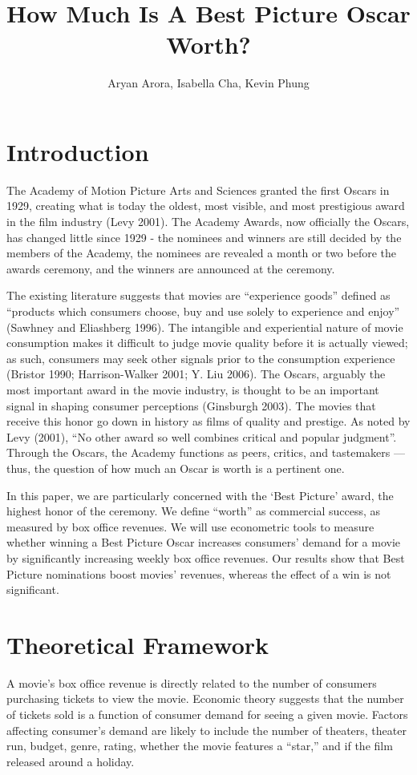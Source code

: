 \documentclass[10.7pt]{article} %
\date{}
\begin{document}
\title{How Much Is A Best Picture Oscar Worth?}
\author{Aryan Arora, Isabella Cha, Kevin Phung}
\maketitle

\section{Introduction}
The Academy of Motion Picture Arts and Sciences granted the first Oscars in 1929, creating what is today the oldest, most visible, and most prestigious award in the film industry (Levy 2001). The Academy Awards, now officially the Oscars, has changed little since 1929 - the nominees and winners are still decided by the members of the Academy, the nominees are revealed a month or two before the awards ceremony, and the winners are announced at the ceremony.

The existing literature suggests that movies are “experience goods” defined as “products which consumers choose, buy and use solely to experience and enjoy” (Sawhney and Eliashberg 1996). The intangible and experiential nature of movie consumption makes it difficult to judge movie quality before it is actually viewed; as such, consumers may seek other signals prior to the consumption experience (Bristor 1990; Harrison-Walker 2001; Y. Liu 2006). The Oscars, arguably the most important award in the movie industry, is thought to be an important signal in shaping consumer perceptions (Ginsburgh 2003). The movies that receive this honor go down in history as films of quality and prestige. As noted by Levy (2001), “No other award so well combines critical and popular judgment”. Through the Oscars, the Academy functions as peers, critics, and tastemakers — thus, the question of how much an Oscar is worth is a pertinent one. 

In this paper, we are particularly concerned with the ‘Best Picture’ award, the highest honor of the ceremony. We define “worth” as commercial success, as measured by box office revenues. We will use econometric tools to measure whether winning a Best Picture Oscar increases consumers’ demand for a movie by significantly increasing weekly box office revenues. Our results show that Best Picture nominations boost movies’ revenues, whereas the effect of a win is not significant.  



\section{Theoretical Framework}
A movie’s box office revenue is directly related to the number of consumers purchasing tickets to view the movie. Economic theory suggests that the number of tickets sold is a function of consumer demand for seeing a given movie. Factors affecting consumer’s demand are likely to include the number of theaters, theater run, budget, genre, rating, whether the movie features a “star,” and if the film released around a holiday. 
\end{document}
